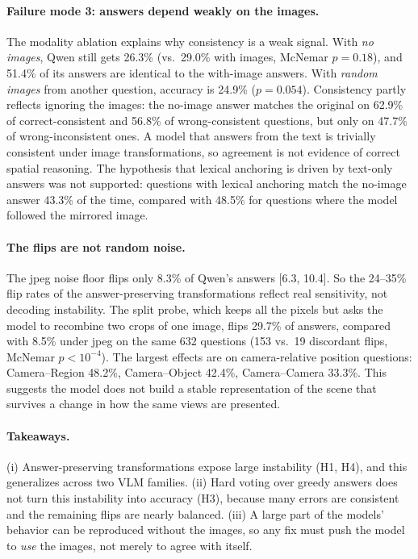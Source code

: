 \paragraph{Failure mode 3: answers depend weakly on the images.}
The modality ablation explains why consistency is a weak signal. With \emph{no images}, Qwen
still gets 26.3\% (vs.\ 29.0\% with images, McNemar $p=0.18$), and 51.4\% of its answers are
identical to the with-image answers. With \emph{random images} from another question, accuracy is
24.9\% ($p=0.054$). Consistency partly reflects ignoring the images: the no-image answer matches
the original on 62.9\% of correct-consistent and 56.8\% of wrong-consistent questions, but only
on 47.7\% of wrong-inconsistent ones. A model that answers from the text is trivially consistent
under image transformations, so agreement is not evidence of correct spatial reasoning. The
hypothesis that lexical anchoring is driven by text-only answers was not supported: questions
with lexical anchoring match the no-image answer 43.3\% of the time, compared with 48.5\% for
questions where the model followed the mirrored image.

\paragraph{The flips are not random noise.}
The jpeg noise floor flips only 8.3\% of Qwen's answers [6.3, 10.4]. So the 24--35\% flip rates
of the answer-preserving transformations reflect real sensitivity, not decoding instability.
The split probe, which keeps all the pixels but asks the model to recombine two crops of one
image, flips 29.7\% of answers, compared with 8.5\% under jpeg on the same 632 questions (153 vs.\
19 discordant flips, McNemar $p<10^{-4}$). The largest effects are on camera-relative position
questions: Camera--Region 48.2\%, Camera--Object 42.4\%, Camera--Camera 33.3\%. This suggests the
model does not build a stable representation of the scene that survives a change in how the same
views are presented.

\paragraph{Takeaways.}
(i) Answer-preserving transformations expose large instability (H1, H4), and this generalizes
across two VLM families. (ii) Hard voting over greedy answers does not turn this instability into
accuracy (H3), because many errors are consistent and the remaining flips are nearly balanced.
(iii) A large part of the models' behavior can be reproduced without the images, so any fix must
push the model to \emph{use} the images, not merely to agree with itself.

